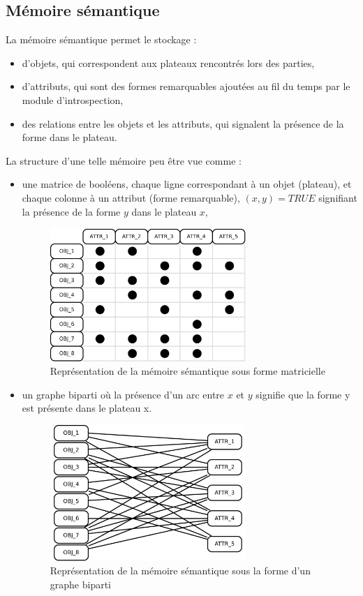 \subsection{Mémoire sémantique}
\label{conception_memoire_semantique}

La mémoire sémantique permet le stockage :
\begin{itemize}
\item d'objets, qui correspondent aux plateaux rencontrés lors des parties,
\item d'attributs, qui sont des formes remarquables ajoutées au fil du temps par le module  d'introspection,
\item des relations entre les objets et les attributs, qui signalent la présence de la forme dans le plateau.
\end{itemize}

La structure d'une telle mémoire peu être vue comme :
\begin{itemize}
\item une matrice de booléens, chaque ligne correspondant à un objet (plateau), et chaque colonne à un attribut (forme remarquable), $(x,y)=TRUE$ signifiant la présence de la forme $y$ dans le plateau $x$,
\begin{figure}[H]
\centering
\includegraphics[width=0.7\textwidth]{files/memoire/context_matrix}
\caption{Représentation de la mémoire sémantique sous forme matricielle}
\end{figure}


\item un graphe biparti où la présence d'un arc entre $x$ et $y$ signifie que la forme y est présente dans le plateau x.
\begin{figure}[H]
\centering
\includegraphics[width=0.7\textwidth]{files/memoire/context_graph}
\caption{Représentation de la mémoire sémantique sous la forme d'un graphe biparti}
\end{figure}
\end{itemize}